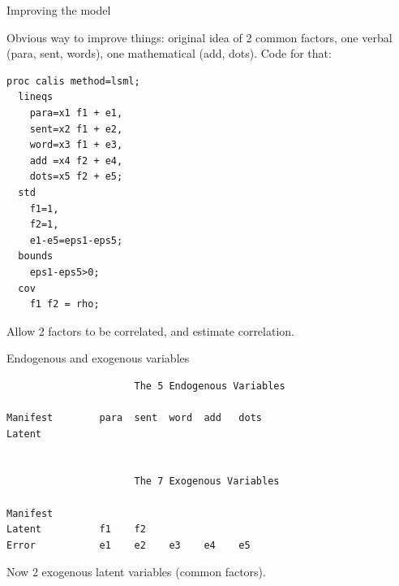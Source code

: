 \documentclass[pdf]{prosper}
\begin{document}
  \begin{slide}{Improving the model}

Obvious way to improve things: original idea of 2 common factors, one verbal (para, sent, words), one mathematical (add, dots). Code for that:

\begin{verbatim}
proc calis method=lsml;
  lineqs
    para=x1 f1 + e1,
    sent=x2 f1 + e2,
    word=x3 f1 + e3,
    add =x4 f2 + e4,
    dots=x5 f2 + e5;
  std
    f1=1,
    f2=1,
    e1-e5=eps1-eps5;
  bounds
    eps1-eps5>0;
  cov
    f1 f2 = rho;

\end{verbatim}

Allow 2 factors to be correlated, and estimate correlation.

  \end{slide}

  \begin{slide}{Endogenous and exogenous variables}
    {\scriptsize
\begin{verbatim}
                      The 5 Endogenous Variables

Manifest        para  sent  word  add   dots                          
Latent                                                                


                      The 7 Exogenous Variables

Manifest                                                              
Latent          f1    f2                                              
Error           e1    e2    e3    e4    e5                            

\end{verbatim}
}

Now 2 exogenous latent variables (common factors).

  \end{slide}
\end{document}
